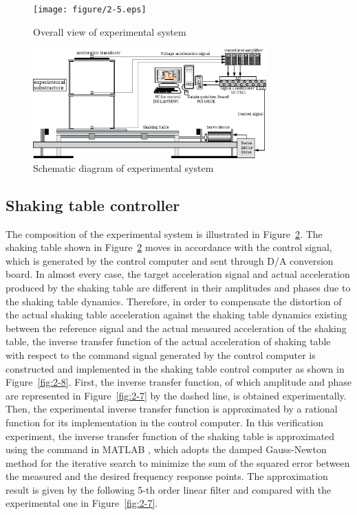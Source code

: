 \begin{figure}[ht]
\centering
\texttt{[image: figure/2-5.eps]}
\caption{Overall view of experimental system}
\label{fig:2-5}
\end{figure}

\begin{figure}[ht]
\centering
\includegraphics[width=0.8\textwidth] {figure/2-6.eps}
\caption{Schematic diagram of experimental system}
\label{fig:2-6}
\end{figure}

\subsection{Shaking table controller}
The composition of the experimental system is illustrated in Figure~\ref{fig:2-6}. The shaking table shown in Figure~\ref{fig:2-6} moves in accordance with the control signal, which is generated by the control computer and sent through D/A conversion board. In almost every case, the target acceleration signal and actual acceleration produced by the shaking table are different in their amplitudes and phases due to the shaking table dynamics. Therefore, in order to compensate the distortion of the actual shaking table acceleration against the shaking table dynamics existing between the reference signal and the actual measured acceleration of the shaking table, the inverse transfer function of the actual acceleration of shaking table with respect to the command signal generated by the control computer is constructed and implemented in the shaking table control computer as shown in Figure~\ref{fig:2-8}. First, the inverse transfer function, of which amplitude and phase are represented in Figure~\ref{fig:2-7} by the dashed line, is obtained experimentally. Then, the experimental inverse transfer function is approximated by a rational function for its implementation in the control computer. In this verification experiment, the inverse transfer function of the shaking table is approximated using the command  in MATLAB \citep{little1992signal}, which adopts the damped Gauss-Newton method for the iterative search to minimize the sum of the squared error between the measured and the desired frequency response points\citep{dennis1983numerical}. The approximation result is given by the following 5-th order linear filter and compared with the experimental one in Figure~\ref{fig:2-7}. 

